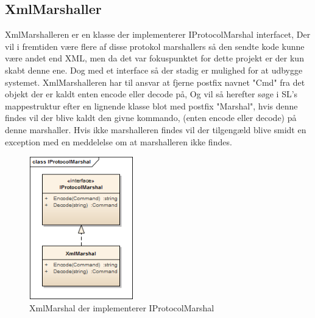 \subsection{XmlMarshaller}
XmlMarshalleren er en klasse der implementerer IProtocolMarshal interfacet, Der vil i fremtiden være flere af disse protokol marshallers så den sendte kode kunne være andet end XML, men da det var fokuspunktet for dette projekt er der kun skabt denne ene. Dog med et interface så der stadig er mulighed for at udbygge systemet. XmlMarshalleren har til ansvar at fjerne postfix navnet "Cmd" fra det objekt der er kaldt enten encode eller decode på, Og vil så herefter søge i \gls{SL}'s mappestruktur efter en lignende klasse blot med postfix "Marshal", hvis denne findes vil der blive kaldt den givne kommando, (enten encode eller decode) på denne marshaller. Hvis ikke marshalleren findes vil der tilgengæld blive smidt en exception med en meddelelse om at marshalleren ikke findes. 

\begin{figure}[H]
	\centering
	\includegraphics[width=0.4\textwidth]{Systemdesign/SharedLib/Images/Klasser/IProtocolMarshal.png}
	\caption{XmlMarshal der implementerer IProtocolMarshal}
	\label{fig:klasseXmlMar}
\end{figure}
